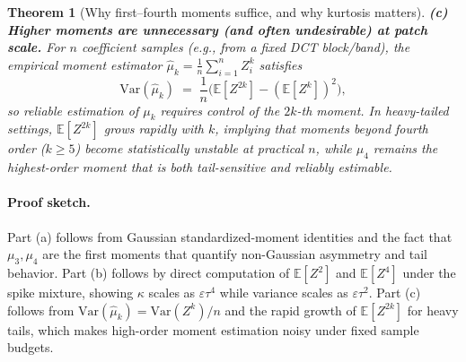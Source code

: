 \documentclass[letterpaper,twocolumn,10pt]{article}
\newtheorem{theorem}{Theorem}
\begin{document}
\begin{theorem}[Why first--fourth moments suffice, and why kurtosis matters]
\noindent\textbf{(c) Higher moments are unnecessary (and often undesirable) at patch scale.}
For $n$ coefficient samples (e.g., from a fixed DCT block/band), the empirical moment estimator
$\widehat{\mu}_k=\frac{1}{n}\sum_{i=1}^n Z_i^k$ satisfies
\[
\mathrm{Var}(\widehat{\mu}_k)
\;=\;\frac{1}{n}\Big(\mathbb{E}[Z^{2k}]-(\mathbb{E}[Z^k])^2\Big),
\]
so reliable estimation of $\mu_k$ requires control of the $2k$-th moment.
In heavy-tailed settings, $\mathbb{E}[Z^{2k}]$ grows rapidly with $k$,
implying that moments beyond fourth order ($k\ge 5$) become statistically unstable at practical $n$,
while $\mu_4$ remains the highest-order moment that is both tail-sensitive and reliably estimable.
\end{theorem}
\paragraph{Proof sketch.}
Part (a) follows from Gaussian standardized-moment identities and the fact that $\mu_3,\mu_4$ are the first moments
that quantify non-Gaussian asymmetry and tail behavior.
Part (b) follows by direct computation of $\mathbb{E}[Z^2]$ and $\mathbb{E}[Z^4]$ under the spike mixture,
showing $\kappa$ scales as $\varepsilon\tau^4$ while variance scales as $\varepsilon\tau^2$.
Part (c) follows from $\mathrm{Var}(\widehat{\mu}_k)=\mathrm{Var}(Z^k)/n$ and the rapid growth of $\mathbb{E}[Z^{2k}]$ for heavy tails,
which makes high-order moment estimation noisy under fixed sample budgets.
\end{document}
